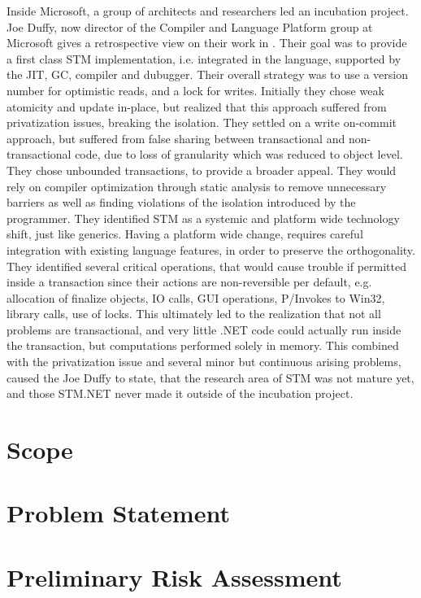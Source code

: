 Inside Microsoft, a group of architects and researchers led an incubation project. Joe Duffy, now director of the Compiler and Language Platform group at Microsoft gives a retrospective view on their work in \cite{duffy2010stmnet}. Their goal was to provide a first class \ac{STM} implementation, i.e. integrated in the language, supported by the \ac{JIT}, \ac{GC}, compiler and dubugger. Their overall strategy was to use a version number for optimistic reads, and a lock for writes. Initially they chose weak atomicity and update in-place, but realized that this approach suffered from privatization issues, breaking the isolation. They settled on a write on-commit approach, but suffered from false sharing between transactional and non-transactional code, due to loss of granularity which was reduced to object level. They chose unbounded transactions, to provide a broader appeal. They would rely on compiler optimization through static analysis to remove unnecessary barriers as well as finding violations of the isolation introduced by the programmer. They identified \ac{STM} as a systemic and platform wide technology shift, just like generics. Having a platform wide change, requires careful integration with existing language features, in order to preserve the orthogonality. They identified several critical operations, that would cause trouble if permitted inside a transaction since their actions are non-reversible per default, e.g. allocation of finalize objects, \ac{IO} calls, GUI operations, P/Invokes to Win32, library calls, use of locks. This ultimately led to the realization that not all problems are transactional, and very little .NET code could actually run inside the transaction, but computations performed solely in memory. This combined with the privatization issue and several minor but continuous arising problems, caused the Joe Duffy to state, that the research area of \ac{STM} was not mature yet, and those STM.NET never made it outside of the incubation project.

\section{Scope}

\section{Problem Statement}

\section{Preliminary Risk Assessment}

\worksheetend